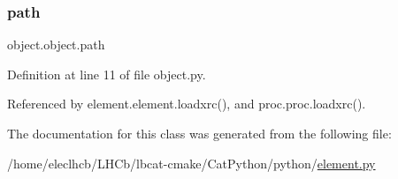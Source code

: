 \subsubsection{\texorpdfstring{path}{path}}
{\footnotesize\ttfamily object.\+object.\+path\hspace{0.3cm}{\ttfamily [inherited]}}



Definition at line 11 of file object.\+py.



Referenced by element.\+element.\+loadxrc(), and proc.\+proc.\+loadxrc().



The documentation for this class was generated from the following file\+:\begin{DoxyCompactItemize}
\item 
/home/eleclhcb/\+L\+H\+Cb/lbcat-\/cmake/\+Cat\+Python/python/\hyperlink{element_8py}{element.\+py}\end{DoxyCompactItemize}
